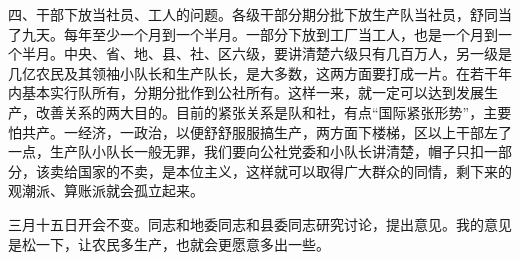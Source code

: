 四、干部下放当社员、工人的问题。各级干部分期分批下放生产队当社员，舒同当了九天。每年至少一个月到一个半月。一部分下放到工厂当工人，也是一个月到一个半月。中央、省、地、县、社、区六级，要讲清楚六级只有几百万人，另一级是几亿农民及其领袖小队长和生产队长，是大多数，这两方面要打成一片。在若干年内基本实行队所有，分期分批作到公社所有。这样一来，就一定可以达到发展生产，改善关系的两大目的。目前的紧张关系是队和社，有点“国际紧张形势”，主要怕共产。一经济，一政治，以便舒舒服服搞生产，两方面下楼梯，区以上干部左了一点，生产队小队长一般无罪，我们要向公社党委和小队长讲清楚，帽子只扣一部分，该卖给国家的不卖，是本位主义，这样就可以取得广大群众的同情，剩下来的观潮派、算账派就会孤立起来。

三月十五日开会不变。同志和地委同志和县委同志研究讨论，提出意见。我的意见是松一下，让农民多生产，也就会更愿意多出一些。


